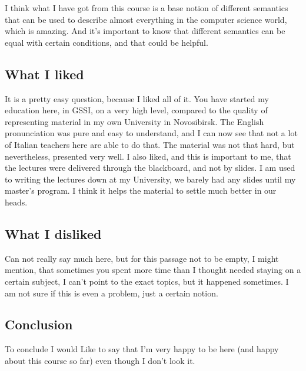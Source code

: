 \documentclass[11pt]{article}
\begin{document}
I think what I have got from this course is a base notion of different semantics that can be used to describe almost everything in the computer science world, which is amazing. And it's important to know that different semantics can be equal with certain conditions, and that could be helpful.

\subsection*{What I liked}

It is a pretty easy question, because I liked all of it. You have started my education here, in GSSI, on a very high level, compared to the quality of representing material in my own University in Novosibirsk. The English pronunciation was pure and easy to understand, and I can now see that not a lot of Italian teachers here are able to do that. The material was not that hard, but nevertheless, presented very well. I also liked, and this is important to me, that the lectures were delivered through the blackboard, and not by slides. I am used to writing the lectures down at my University, we barely had any slides until my master's program. I think it helps the material to settle much better in our heads.

\subsection*{What I disliked}

Can not really say much here, but for this passage not to be empty, I might mention, that sometimes you spent more time than I thought needed staying on a certain subject, I can't point to the exact topics, but it happened sometimes. I am not sure if this is even a problem, just a certain notion.

\subsection*{Conclusion}

To conclude I would Like to say that I'm very happy to be here (and happy about this course so far) even though I don't look it.
\end{document}
